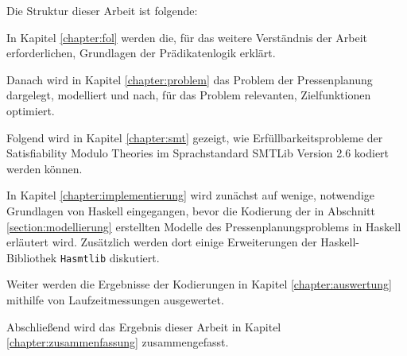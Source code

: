 Die Struktur dieser Arbeit ist folgende:

In Kapitel \ref{chapter:fol} werden die, für das weitere Verständnis der Arbeit erforderlichen, Grundlagen der Prädikatenlogik erklärt.

Danach wird in Kapitel \ref{chapter:problem} das Problem der Pressenplanung dargelegt, modelliert und nach, für das Problem relevanten, Zielfunktionen optimiert.

Folgend wird in Kapitel \ref{chapter:smt} gezeigt, wie Erfüllbarkeitsprobleme der Satisfiability Modulo Theories im Sprachstandard SMTLib Version 2.6 kodiert werden können.

In Kapitel \ref{chapter:implementierung} wird zunächst auf wenige, notwendige Grundlagen von Haskell eingegangen,
bevor die Kodierung der in Abschnitt \ref{section:modellierung} erstellten Modelle des Pressenplanungsproblems in Haskell erläutert wird.
Zusätzlich werden dort einige Erweiterungen der Haskell-Bibliothek \texttt{Hasmtlib} diskutiert.

Weiter werden die Ergebnisse der Kodierungen in Kapitel \ref{chapter:auswertung} mithilfe von Laufzeitmessungen ausgewertet.

Abschließend wird das Ergebnis dieser Arbeit in Kapitel \ref{chapter:zusammenfassung} zusammengefasst.